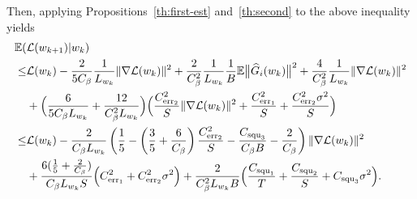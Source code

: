 \documentclass{osudissert96}
\begin{document}
	Then, 
	applying Propositions~\ref{th:first-est} and~\ref{th:second} to  the above inequality yields
	\begin{align}\label{sikas}
	\mathbb{E}(& \mathcal{L}(w_{k+1})| w_k)  \nonumber
	 \\\leq & \mathcal{L}(w_{k}) -\frac{2}{5C_\beta} \frac{1}{ L_{w_k}}  \|\nabla \mathcal{L}(w_{k})\|^2+ \frac{2}{C_\beta^2} \frac{1}{L_{w_k}}  \frac{1}{B}\mathbb{E}  \big\|   \widehat G_i(w_k) \big \|^2  +    \frac{4}{C_\beta^2} \frac{1}{L_{w_k}} \|\nabla \mathcal{L}(w_{k})\|^2    \nonumber
	\\ &+ \Big(\frac{6}{5C_\beta L_{w_k}}  + \frac{12}{C_\beta^2 L_{w_k}} \Big) \Big ( \frac{C^2_{{\text{\normalfont err}}_2}  }{S}\|\nabla \mathcal{L}(w_k)\|^2 +\frac{C^2_{{\text{\normalfont err}}_1}}{S} + \frac{C^2_{{\text{\normalfont err}}_2} \sigma^2  }{S}\Big ) 
	  \nonumber
	\\ \leq & \mathcal{L}(w_{k}) - \frac{2}{C_\beta L_{w_k}} \left(   \frac{1}{5} - \left(\frac{3}{5} + \frac{6}{C_\beta}\right)\frac{C^2_{{\text{\normalfont err}}_2} }{S} - \frac{C_{\text{\normalfont squ}_3}}{C_\beta B} - \frac{2}{C_\beta}\right) \|\nabla \mathcal{L}(w_k) \|^2 \nonumber
	\\ &+ \frac{6( \frac{1}{5} +\frac{2}{C_\beta})}{C_\beta L_{w_k}S}\Big( C^2_{{\text{\normalfont err}}_1} +C^2_{{\text{\normalfont err}}_2}\sigma^2\Big)  +  \frac{2}{C_\beta^2 L_{w_k}B} \Big(  \frac{C_{\text{\normalfont squ}_1}}{T}  +  \frac{C_{\text{\normalfont squ}_2}}{S} + C_{\text{\normalfont squ}_3} \sigma^2 \Big).
	\end{align}
\end{document}
